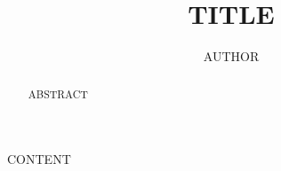 \documentclass{llncs}
\begin{document}
\title{TITLE}

\author{AUTHOR}


\maketitle              %

\begin{abstract}

ABSTRACT

\end{abstract}

CONTENT



\nocite{*}
\end{document}
